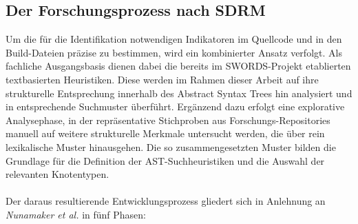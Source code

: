 \documentclass[12pt,titlepage]{article}
\begin{document}
\subsection{Der Forschungsprozess nach SDRM}
Um die für die Identifikation notwendigen Indikatoren im Quellcode und in den Build-Dateien präzise zu bestimmen, wird ein kombinierter Ansatz verfolgt. Als fachliche Ausgangsbasis dienen dabei die bereits im SWORDS-Projekt\cite{SWORDS_template_UP_2024}  etablierten textbasierten Heuristiken. Diese werden im Rahmen dieser Arbeit auf ihre strukturelle Entsprechung innerhalb des Abstract Syntax Trees hin analysiert und in entsprechende Suchmuster überführt. Ergänzend dazu erfolgt eine explorative Analysephase, in der repräsentative Stichproben aus Forschungs-Repositories manuell auf weitere strukturelle Merkmale untersucht werden, die über rein lexikalische Muster hinausgehen. Die so zusammengesetzten Muster bilden die Grundlage für die Definition der AST-Suchheuristiken und die Auswahl der relevanten Knotentypen.\\
\\
Der daraus resultierende Entwicklungsprozess gliedert sich in Anlehnung an \textit{Nunamaker et al.}\cite{Nunamaker_Chen_1990} in fünf Phasen:
\end{document}
